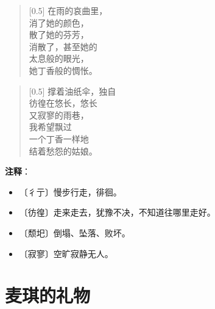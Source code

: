\documentclass[12pt,UTF-8,openany]{ctexbook}
\begin{document}
\begin{normalsize}
    
    \begin{verse}[0.5\linewidth]
        在雨的哀曲里， \\
        消了她的颜色， \\
        散了她的芬芳， \\
        消散了，甚至她的 \\
        太息般的眼光， \\
        她丁香般的惆怅。
    \end{verse}
    
    
    \begin{verse}[0.5\linewidth]
        撑着油纸伞，独自 \\
        彷徨在悠长，悠长 \\
        又寂寥的雨巷， \\
        我希望飘过 \\
        一个丁香一样地 \\
        结着愁怨的姑娘。
    \end{verse}
    
\end{normalsize}


\newpage

\textbf{注释}：

\vspace{-1em}

\begin{itemize}
    \setlength\itemsep{-0.2em}
    \item 〔彳亍〕慢步行走，徘徊。
    \item 〔彷徨〕走来走去，犹豫不决，不知道往哪里走好。
    \item 〔颓圯〕倒塌、坠落、败坏。
    \item 〔寂寥〕空旷寂静无人。
\end{itemize}

\chapter{麦琪的礼物}
\end{document}
